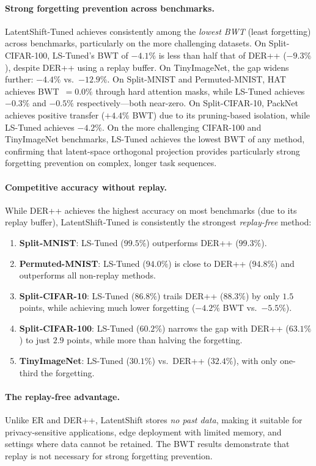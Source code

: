 \documentclass{article}
\begin{document}
\paragraph{Strong forgetting prevention across benchmarks.}
LatentShift-Tuned achieves consistently among the \emph{lowest
BWT} (least forgetting) across benchmarks, particularly on the more
challenging datasets. On Split-CIFAR-100, LS-Tuned's BWT of $-4.1\%$ is less than
half that of DER++ ($-9.3\%$), despite DER++ using a replay buffer.
On TinyImageNet, the gap widens further: $-4.4\%$ vs.\ $-12.9\%$.
On Split-MNIST and Permuted-MNIST, HAT achieves BWT~$= 0.0\%$ through hard
attention masks, while LS-Tuned achieves $-0.3\%$ and $-0.5\%$ respectively---both
near-zero. On Split-CIFAR-10, PackNet achieves positive transfer ($+4.4\%$ BWT)
due to its pruning-based isolation, while LS-Tuned achieves $-4.2\%$.
On the more challenging CIFAR-100 and TinyImageNet benchmarks, LS-Tuned
achieves the lowest BWT of any method, confirming that latent-space
orthogonal projection provides particularly strong forgetting prevention
on complex, longer task sequences.

\paragraph{Competitive accuracy without replay.}
While DER++ achieves the highest accuracy on most benchmarks (due to its
replay buffer), LatentShift-Tuned is consistently the strongest
\emph{replay-free} method:
\begin{enumerate}
    \item \textbf{Split-MNIST}: LS-Tuned ($99.5\%$) outperforms DER++ ($99.3\%$).
    \item \textbf{Permuted-MNIST}: LS-Tuned ($94.0\%$) is close to DER++
          ($94.8\%$) and outperforms all non-replay methods.
    \item \textbf{Split-CIFAR-10}: LS-Tuned ($86.8\%$) trails DER++ ($88.3\%$)
          by only $1.5$ points, while achieving much lower forgetting ($-4.2\%$
          BWT vs.\ $-5.5\%$).
    \item \textbf{Split-CIFAR-100}: LS-Tuned ($60.2\%$) narrows the gap with
          DER++ ($63.1\%$) to just $2.9$ points, while more than halving the forgetting.
    \item \textbf{TinyImageNet}: LS-Tuned ($30.1\%$) vs.\ DER++ ($32.4\%$),
          with only one-third the forgetting.
\end{enumerate}

\paragraph{The replay-free advantage.}
Unlike ER and DER++, LatentShift stores \emph{no past data}, making it suitable
for privacy-sensitive applications, edge deployment with limited memory, and
settings where data cannot be retained. The BWT results demonstrate that
replay is not necessary for strong forgetting prevention.
\end{document}
